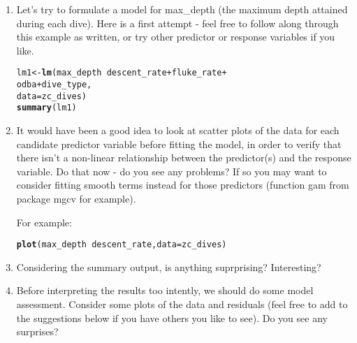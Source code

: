 \documentclass[12pt]{article}\usepackage[]{graphicx}\usepackage[]{color}
\makeatletter
\newcommand{\hlopt}[1]{\textcolor[rgb]{0,0,0}{#1}}%
\newcommand{\hlstd}[1]{\textcolor[rgb]{0.345,0.345,0.345}{#1}}%
\newcommand{\hlkwb}[1]{\textcolor[rgb]{0.69,0.353,0.396}{#1}}%
\newcommand{\hlkwc}[1]{\textcolor[rgb]{0.333,0.667,0.333}{#1}}%
\newcommand{\hlkwd}[1]{\textcolor[rgb]{0.737,0.353,0.396}{\textbf{#1}}}%
\newenvironment{kframe}{%
 \def\at@end@of@kframe{}%
 \ifinner\ifhmode%
  \def\at@end@of@kframe{\end{minipage}}%
  \begin{minipage}{\columnwidth}%
 \fi\fi%
 \def\FrameCommand##1{\hskip\@totalleftmargin \hskip-\fboxsep
 \colorbox{shadecolor}{##1}\hskip-\fboxsep
     \hskip-\linewidth \hskip-\@totalleftmargin \hskip\columnwidth}%
 \MakeFramed {\advance\hsize-\width
   \@totalleftmargin\z@ \linewidth\hsize
   \@setminipage}}%
 {\par\unskip\endMakeFramed%
 \at@end@of@kframe}
\newenvironment{knitrout}{}{} %
\makeatother
\begin{document}
\begin{enumerate}
  \item Let's try to formulate a model for max\_depth (the maximum depth attained during each dive). Here is a first attempt - feel free to follow along through this example as written, or try other predictor or response variables if you like.
  
\begin{knitrout}
\color{fgcolor}\begin{kframe}
\begin{alltt}
\hlstd{lm1} \hlkwb{<-} \hlkwd{lm}\hlstd{(max_depth} \hlopt{~} \hlstd{descent_rate} \hlopt{+} \hlstd{fluke_rate} \hlopt{+}
            \hlstd{odba} \hlopt{+} \hlstd{dive_type,}
          \hlkwc{data}\hlstd{=zc_dives)}
\hlkwd{summary}\hlstd{(lm1)}
\end{alltt}
\end{kframe}
\end{knitrout}

\item It would have been a good idea to look at scatter plots of the data for each candidate predictor variable before fitting the model, in order to verify that there isn't a non-linear relationship between the predictor(s) and the response variable.  Do that now - do you see any problems? If so you may want to consider fitting smooth terms instead for those predictors (function gam from package mgcv for example).

For example:

\begin{knitrout}
\color{fgcolor}\begin{kframe}
\begin{alltt}
\hlkwd{plot}\hlstd{(max_depth}\hlopt{~}\hlstd{descent_rate,} \hlkwc{data}\hlstd{=zc_dives)}
\end{alltt}
\end{kframe}
\end{knitrout}

\item Considering the summary output, is anything suprprising? Interesting?

\item Before interpreting the results too intently, we should do some model assessment. Consider some plots of the data and residuals (feel free to add to the suggestions below if you have others you like to see). Do you see any surprises?


\end{enumerate}
\end{document}
